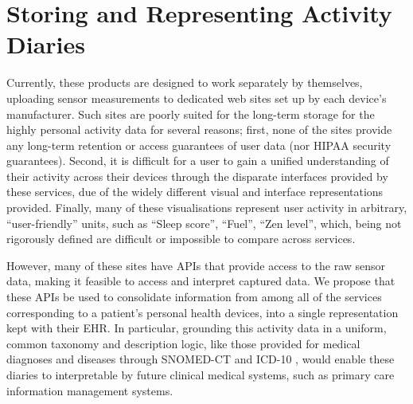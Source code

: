 \documentclass{chi-ext}
\begin{document}


\section{Storing and Representing Activity Diaries}

Currently, these products are designed to work separately by themselves, uploading sensor measurements to dedicated web sites set up by each device's manufacturer.  Such sites are poorly suited for the long-term storage for the highly personal activity data for several reasons; first, none of the sites provide any long-term retention or access guarantees of user data (nor HIPAA security guarantees).  Second, it is difficult for a user to gain a unified understanding of their activity across their devices through the disparate interfaces provided by these services, due of the widely different visual and interface representations provided. Finally, many of these visualisations represent user activity in arbitrary, ``user-friendly'' units, such as ``Sleep score'', ``Fuel'', ``Zen level'', which, being not rigorously defined are difficult or impossible to compare across services.

However, many of these sites have APIs that provide access to the raw sensor data, making it feasible to access and interpret captured data.  We propose that these APIs be used to consolidate information from among all of the services corresponding to a patient's personal health devices, into a single representation kept with their EHR.  In particular, grounding this activity data in a uniform, common taxonomy and description logic, like those provided for medical diagnoses and diseases through SNOMED-CT \cite{stearns2001snomed} and ICD-10 \cite{world1993icd}, would enable these diaries to interpretable by future clinical medical systems, such as primary care information management systems. 
\end{document}
